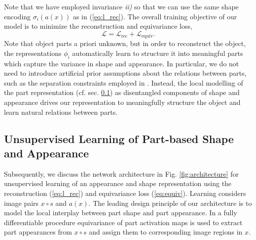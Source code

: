     Note that we have employed invariance \emph{ii)} so that we can use the same shape encoding $\sigma_i(a(x))$ as in (\ref{eq:l_rec}).
    The overall training objective of our model is to minimize the reconstruction and equivariance loss,
    \begin{equation}
        \mathcal{L} =  \mathcal{L}_\text{rec} + \mathcal{L}_\text{equiv}
        \label{eq:totalloss}
        .
    \end{equation}
    Note that object parts a priori unknown, but in order to reconstruct the object, the representations $\phi_i$ automatically learn to structure it into meaningful parts which capture the variance in shape and appearance. In particular, we do not need to introduce artificial prior assumptions about the relations between parts, such as the separation constraints employed in \cite{Zhang:2018vz, Thewlis:2017wi}.
    Instead, the local modelling of the part representation (cf. sec. \ref{sec:architecture}) as disentangled components of shape and appearance drives our representation to meaningfully structure the object and learn natural relations between parts.

\subsection{Unsupervised Learning of Part-based Shape and Appearance}
    \label{sec:architecture}
    Subsequently, we discuss the network architecture in Fig. \ref{fig:architecture} for unsupervised learning of an appearance and shape representation using the reconstruction (\ref{eq:l_rec}) and equivariance loss (\ref{eq:equiv}).
    Learning considers image pairs $x {{\circ}} s$ and  $a(x)$.
    The leading design principle of our architecture is to model the local interplay between part shape and part appearance.
    In a fully differentiable procedure equivariance of part activation maps is used to extract part appearances from $x {{\circ}} s$ and assign them to corresponding image regions in $x$.


